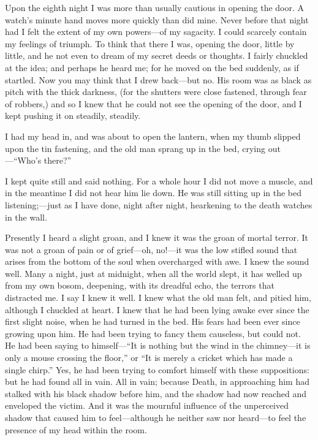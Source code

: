 \documentclass[11pt,a4paper]{article}
\begin{document}
\begin{linenumbers}
Upon the eighth night I was more than usually cautious in opening the door. A watch's minute hand moves more
quickly than did mine. Never before that night had I felt the extent of my own powers---of my sagacity. I could
scarcely contain my feelings of triumph. To think that there I was, opening the door, little by little, and he not
even to dream of my secret deeds or thoughts. I fairly chuckled at the idea; and perhaps he heard me; for he moved
on the bed suddenly, as if startled. Now you may think that I drew back---but no. His room was as black as pitch
with the thick darkness, (for the shutters were close fastened, through fear of robbers,) and so I knew that he
could not see the opening of the door, and I kept pushing it on steadily, steadily.

I had my head in, and was about to open the lantern, when my thumb slipped upon the tin fastening, and the old man
sprang up in the bed, crying out---``Who's there?''

I kept quite still and said nothing. For a whole hour I did not move a muscle, and in the meantime I did not hear
him lie down. He was still sitting up in the bed listening;---just as I have done, night after night, hearkening to
the death watches in the wall.

Presently I heard a slight groan, and I knew it was the groan of mortal terror. It was not a groan of pain or of
grief---oh, no!---it was the low stifled sound that arises from the bottom of the soul when overcharged with awe.
I knew the sound well. Many a night, just at midnight, when all the world slept, it has welled up from my own
bosom, deepening, with its dreadful echo, the terrors that distracted me. I say I knew it well. I knew what the old
man felt, and pitied him, although I chuckled at heart. I knew that he had been lying awake ever since the first
slight noise, when he had turned in the bed. His fears had been ever since growing upon him. He had been trying to
fancy them causeless, but could not. He had been saying to himself---``It is nothing but the wind in the
chimney---it is only a mouse crossing the floor,'' or ``It is merely a cricket which has made a single chirp.''
Yes, he had been trying to comfort himself with these suppositions: but he had found all in vain. All in vain;
because Death, in approaching him had stalked with his black shadow before him, and the shadow had now reached and
enveloped the victim. And it was the mournful influence of the unperceived shadow that caused him to feel---although
he neither saw nor heard---to feel the presence of my head within the room.
\end{linenumbers}
\end{document}

